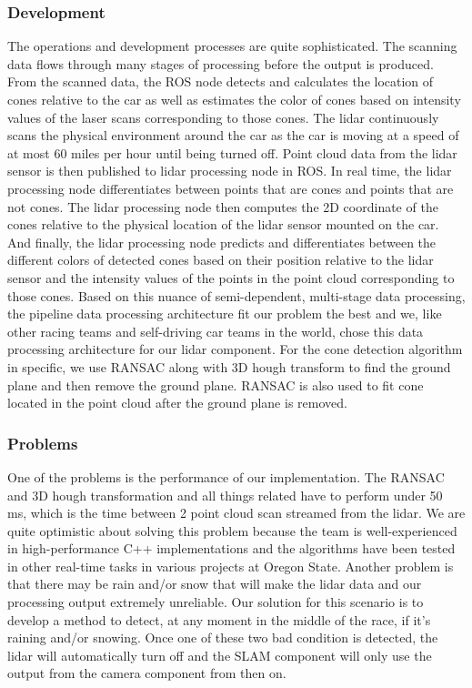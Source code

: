 \documentclass[10pt, onecolumn, draftclsnofoot, letterpaper,compsoc]{IEEEtran}
\begin{document}
\subsubsection{Development}

The operations and development processes are quite sophisticated. The scanning data flows through many stages of processing before the output is produced. From the scanned data, the ROS node detects and calculates the location of cones relative to the car as well as estimates the color of cones based on intensity values of the laser scans corresponding to those cones. The lidar continuously scans the physical environment around the car as the car is moving at a speed of at most 60 miles per hour until being turned off. Point cloud data from the lidar sensor is then published to lidar processing node in ROS. In real time, the lidar processing node differentiates between points that are cones and points that are not cones. The lidar processing node then computes the 2D coordinate of the cones relative to the physical location of the lidar sensor mounted on the car. And finally, the lidar processing node predicts and differentiates between the different colors of detected cones based on their position relative to the lidar sensor and the intensity values of the points in the point cloud corresponding to those cones. Based on this nuance of semi-dependent, multi-stage data processing, the pipeline data processing architecture fit our problem the best and we, like other racing teams and self-driving car teams in the world, chose this data processing architecture for our lidar component. For the cone detection algorithm in specific, we use RANSAC along with 3D hough transform to find the ground plane and then remove the ground plane. RANSAC is also used to fit cone located in the point cloud after the ground plane is removed.

\subsubsection{Problems}

One of the problems is the performance of our implementation. The RANSAC and 3D hough transformation and all things related have to perform under 50 ms, which is the time between 2 point cloud scan streamed from the lidar. We are quite optimistic about solving this problem because the team is well-experienced in high-performance C++ implementations and the algorithms have been tested in other real-time tasks in various projects at Oregon State. Another problem is that there may be rain and/or snow that will make the lidar data and our processing output extremely unreliable. Our solution for this scenario is to develop a method to detect, at any moment in the middle of the race, if it's raining and/or snowing. Once one of these two bad condition is detected, the lidar will automatically turn off and the SLAM component will only use the output from the camera component from then on.
\end{document}
